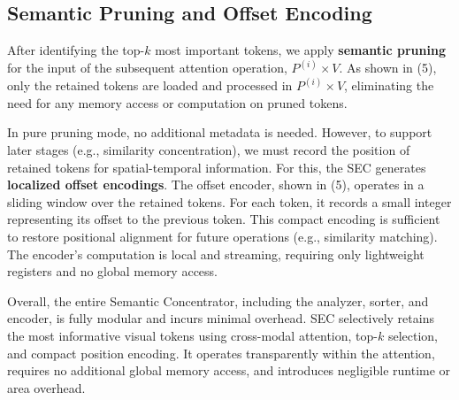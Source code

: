 \subsection{Semantic Pruning and Offset Encoding}
\label{subsec:offset_encoding}
After identifying the top-$k$ most important tokens, we apply \textbf{semantic pruning} for the input of the subsequent attention operation, $P^{(i)}\times V$. 
As shown in (5), only the retained tokens are loaded and processed in $P^{(i)}\times V$, eliminating the need for any memory access or computation on pruned tokens.

In pure pruning mode, no additional metadata is needed. 
However, to support later stages (e.g., similarity concentration), we must record the position of retained tokens for spatial-temporal information. 
For this, the SEC generates \textbf{localized offset encodings}.
The offset encoder, shown in (5), operates in a sliding window over the retained tokens. 
For each token, it records a small integer representing its offset to the previous token. 
This compact encoding is sufficient to restore positional alignment for future operations (e.g., similarity matching).
The encoder's computation is local and streaming, requiring only lightweight registers and no global memory access. 


Overall, the entire Semantic Concentrator, including the analyzer, sorter, and encoder, is fully modular and incurs minimal overhead.
SEC selectively retains the most informative visual tokens using cross-modal attention, top-$k$ selection, and compact position encoding. 
It operates transparently within the attention, requires no additional global memory access, and introduces negligible runtime or area overhead.
